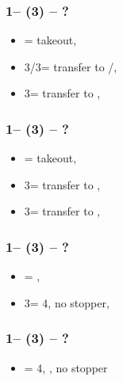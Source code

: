 \documentclass[12pt, a4paper]{article}
\begin{document}

\subsubsection*{1\clubs -- (3\clubs) -- ?}
\begin{itemize}
    \item \dbl = takeout, \gf
    \item 3\diams/3\hearts = transfer to \hearts/\spades, \invp
    \item 3\spades = transfer to \diams, \gf
\end{itemize}

\subsubsection*{1\clubs -- (3\diams) -- ?}
\begin{itemize}
    \item \dbl = takeout, \gf
    \item 3\hearts = transfer to \spades, \invp
    \item 3\spades = transfer to \hearts, \gf
\end{itemize}

\subsubsection*{1\clubs -- (3\hearts) -- ?}
\begin{itemize}
    \item \dbl = \spades, \invp
    \item 3\spades = 4\spades, no \hearts stopper, \gf
\end{itemize}

\subsubsection*{1\clubs -- (3\spades) -- ?}
\begin{itemize}
    \item \dbl = 4\hearts, \gf, no \spades stopper
\end{itemize}

\end{document}
